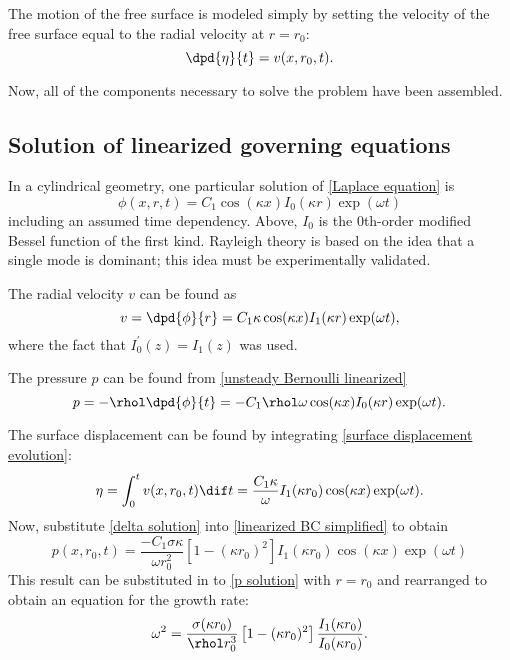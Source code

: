 \documentclass[ccbysa,note,git]{bmtreport}
\begin{document}
The motion of the free surface is modeled simply by setting the velocity of the free surface equal to the radial velocity at $r = r_0$:
\begin{equation}
   \dpd{\eta}{t} = v(x, r_0, t). \label{eq:surface displacement evolution}
\end{equation}

Now, all of the components necessary to solve the problem have been assembled.

\subsection{Solution of linearized governing equations}

In a cylindrical geometry, one particular solution of \eqref{Laplace equation} is
\begin{equation}
   \phi(x, r, t) = C_1 \cos(\kappa x) I_0(\kappa r) \exp(\omega t)
\end{equation}
including an assumed time dependency. Above, $I_0$ is the $0$th-order modified Bessel function of the first kind. Rayleigh theory is based on the idea that a single mode is dominant; this idea must be experimentally validated.

The radial velocity $v$ can be found as
\begin{equation}
   v = \dpd{\phi}{r} = C_1 \kappa \cos(\kappa x) I_1(\kappa r) \exp(\omega t),
\end{equation}
where the fact that $I_0^\prime(z) = I_1(z)$ was used.

The pressure $p$ can be found from \eqref{unsteady Bernoulli linearized}
\begin{equation}
   p = -\rhol \dpd{\phi}{t} = -C_1 \rhol \omega \cos(\kappa x) I_0(\kappa r) \exp(\omega t). \label{eq:p solution}
\end{equation}

The surface displacement can be found by integrating \eqref{surface displacement evolution}:
\begin{equation}
   \eta = \int_0^t v(x, r_0, t) \dif t = \frac{C_1 \kappa}{\omega} I_1(\kappa r_0) \cos(\kappa x) \exp(\omega t). \label{eq:delta solution}
\end{equation}
Now, substitute \eqref{delta solution} into \eqref{linearized BC simplified} to obtain
\begin{equation}
   p(x, r_0, t) = \frac{-C_1 \sigma \kappa}{\omega r_0^2} \left[1 - (\kappa r_0)^2\right] I_1(\kappa r_0) \cos(\kappa x) \exp(\omega t)
\end{equation}
This result can be substituted in to \eqref{p solution} with $r = r_0$ and rearranged to obtain an equation for the growth rate:
\begin{equation}
   \omega^2 = \frac{\sigma (\kappa r_0)}{\rhol r_0^3} \left[1 - (\kappa r_0)^2\right] \frac{I_1(\kappa r_0)}{I_0(\kappa r_0)}. \label{eq:Rayleigh growth rate exact}
\end{equation}
\end{document}
